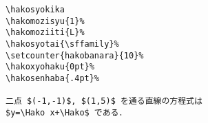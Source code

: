 \begin{verbatim}
\hakosyokika
\hakomozisyu{1}%
\hakomoziiti{L}%
\hakosyotai{\sffamily}%
\setcounter{hakobanara}{10}%
\hakoxyohaku{0pt}%
\hakosenhaba{.4pt}%

二点 $(-1,-1)$, $(1,5)$ を通る直線の方程式は
$y=\Hako x+\Hako$ である．
\end{verbatim}
